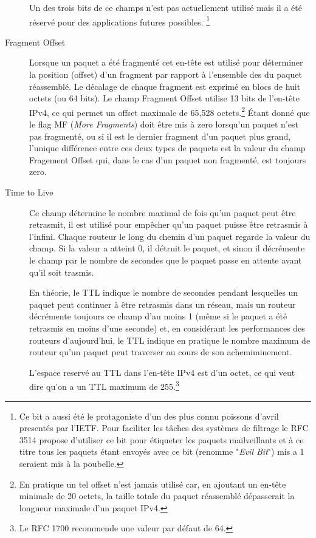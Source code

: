 \begin{description}
Un des trois bits de ce champs n'est pas actuellement utilisé mais il a été
réservé pour des applications futures possibles.
\footnote {Ce bit a aussi été le protagoniste d'un des plus connu poissons
d'avril presentés par l'IETF. Pour faciliter les tâches des systèmes de filtrage 
le RFC 3514 propose d'utiliser ce bit pour étiqueter les paquets mailveillants et à ce
titre tous les paquets étant envoyés avec ce bit (renomme "{\it Evil Bit}") 
mis a 1 seraient mis à la poubelle.}

\item [Fragment Offset]
Lorsque un paquet a été fragmenté cet en-tête est utilisé pour déterminer la
position (offset) d'un fragment par rapport à l'ensemble des du paquet réassemblé.
Le décalage de chaque fragment est exprimé en blocs de huit octets (ou 64
bits). Le champ Fragment Offset utilise 13 bits de l'en-tête IPv4, ce qui permet
un offset maximale de 65,528 octets.\footnote {En pratique un tel offset n'est
jamais utilisé car, en ajoutant un en-tête minimale de 20 octets, la taille
totale du paquet réassemblé dépasserait la longueur maximale d'un paquet IPv4.}
Étant donné que le flag MF ({\it More Fragments}) doit être mis à zero lorsqu'un paquet 
n'est pas fragmenté, ou si il est le dernier fragment d'un paquet plus grand, 
l'unique différence entre ces deux types de paquets est la valeur du 
champ Fragement Offset qui, dans le cas d'un paquet non fragmenté, est
toujours zero.

\item [Time to Live]
Ce champ détermine le nombre maximal de fois qu'un paquet peut être retrasmit, 
il est utilisé pour empêcher qu'un paquet puisse être retrasmis à l'infini.
Chaque routeur le long du chemin d'un paquet regarde la valeur du champ. Si la 
valeur a atteint 0, il détruit le paquet, et sinon il décrémente le champ par le
nombre de secondes que le paquet passe en attente avant qu'il soit trasmis.

En théorie, le TTL indique le nombre de secondes pendant lesquelles un paquet
peut continuer à être retrasmis dans un réseau, mais un routeur 
 décrémente toujours ce champ d'au moins 1 (même si le paquet a été
retrasmis en moins d'une seconde) et, en considérant les performances des routeurs
d'aujourd'hui, le TTL indique en pratique le nombre maximum de routeur qu'un paquet
 peut traverser au cours de son achemiminement.

L'espace reservé au TTL dans l'en-tête IPv4 est d'un octet, ce qui veut dire qu'on a un 
TTL maximum de 255.\footnote {Le RFC 1700 recommende une valeur par défaut de 64.}


\end{description}

